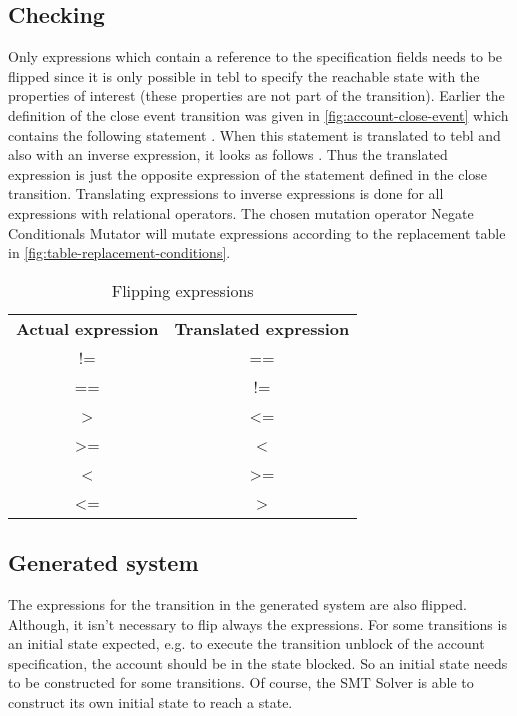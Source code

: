 
\subsection{Checking}
Only expressions which contain a reference to the specification fields needs to
be flipped since it is only possible in tebl to specify the reachable state with
the properties of interest (these properties are not part of the transition).
Earlier the definition of the close event transition was given in
\autoref{fig:account-close-event} which contains the following statement
. When this statement is translated to tebl and
also with an inverse expression, it looks as follows
. Thus the translated expression is just the opposite
expression of the statement defined in the close transition. Translating
expressions to inverse expressions is done for all expressions with relational
operators. The chosen mutation operator Negate Conditionals Mutator will mutate
expressions according to the replacement table in
\autoref{fig:table-replacement-conditions}.

\begin{table}[]
\centering
\begin{tabular}{cc}
\textbf{Actual expression} & \textbf{Translated expression} \\
!=                         & ==                             \\
==                         & !=                             \\
\textgreater               & \textless=                     \\
\textgreater=              & \textless                      \\
\textless                  & \textgreater=                  \\
\textless=                 & \textgreater                   \\
\end{tabular}
\caption{Flipping expressions}
\label{fig:table-replacement-conditions}
\end{table}

\subsection{Generated system}
The expressions for the transition in the generated system are also flipped.
Although, it isn't necessary to flip always the expressions. For some
transitions is an initial state expected, e.g. to execute the transition unblock
of the account specification, the account should be in the state blocked. So an
initial state needs to be constructed for some transitions. Of course, the SMT
Solver is able to construct its own initial state to reach a state.


